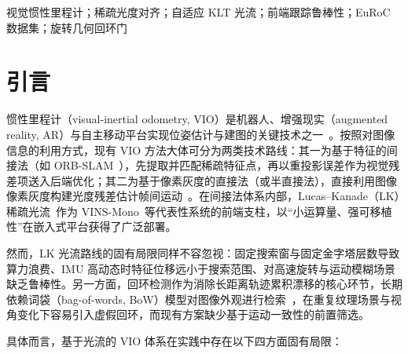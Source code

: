 \documentclass[letterpaper,journal]{IEEEtran}
\begin{document}
\begin{IEEEkeywords}
视觉惯性里程计；稀疏光度对齐；自适应 KLT 光流；前端跟踪鲁棒性；EuRoC 数据集；旋转几何回环门
\end{IEEEkeywords}

\section{引言}
惯性里程计（visual-inertial odometry, VIO）是机器人、增强现实（augmented reality, AR）与自主移动平台实现位姿估计与建图的关键技术之一~\cite{cadena2010past,davison2007monoslam,klein2007ptam,engel2014lsd,mur2015orb,forster2014svo,qin2018vins}。按照对图像信息的利用方式，现有 VIO 方法大体可分为两类技术路线：其一为基于特征的间接法（如 ORB-SLAM~\cite{mur2015orb,campos2021orb}），先提取并匹配稀疏特征点，再以重投影误差作为视觉残差项送入后端优化；其二为基于像素灰度的直接法（或半直接法），直接利用图像像素灰度构建光度残差估计帧间运动~\cite{engel2017dso,forster2017svo}。在间接法体系内部，Lucas--Kanade（LK）稀疏光流~\cite{baker2004lucas}作为 VINS-Mono~\cite{qin2018vins}等代表性系统的前端支柱，以``小运算量、强可移植性''在嵌入式平台获得了广泛部署。

然而，LK 光流路线的固有局限同样不容忽视：固定搜索窗与固定金字塔层数导致算力浪费、IMU 高动态时特征位移远小于搜索范围、对高速旋转与运动模糊场景缺乏鲁棒性。另一方面，回环检测作为消除长距离轨迹累积漂移的核心环节，长期依赖词袋（bag-of-words, BoW）模型对图像外观进行检索~\cite{galvez2012bags}，在重复纹理场景与视角变化下容易引入虚假回环，而现有方案缺少基于运动一致性的前置筛选。

具体而言，基于光流的 VIO 体系在实践中存在以下四方面固有局限：
\end{document}
